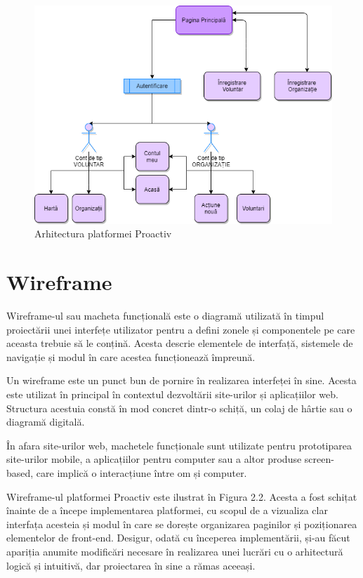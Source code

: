 \documentclass[12pt,a4paper]{report}
\begin{document}
\begin{figure}[H]
\centering
  \includegraphics[width=1\linewidth]{./imagini/arhitectura.png}
  \caption{Arhitectura platformei Proactiv}
\end{figure}

\section{Wireframe}
\par
Wireframe-ul sau macheta funcțională este o diagramă utilizată în timpul proiectării unei interfețe utilizator pentru a defini zonele și componentele pe care aceasta trebuie să le conțină. Acesta descrie elementele de interfață, sistemele de navigație și modul în care acestea funcționează împreună.
\\\par
Un wireframe este un punct bun de pornire în realizarea interfeței în sine. Acesta este utilizat în principal în contextul dezvoltării site-urilor și aplicațiilor web. Structura acestuia constă în mod concret dintr-o schiță, un colaj de hârtie sau o diagramă digitală.
\\\par
În afara site-urilor web, machetele funcționale sunt utilizate pentru prototiparea site-urilor mobile, a aplicațiilor pentru computer sau a altor produse screen-based, care implică o interacțiune între om și computer.
\\\par
Wireframe-ul platformei Proactiv este ilustrat în Figura 2.2. Acesta a fost schițat înainte de a începe implementarea platformei, cu scopul de a vizualiza clar interfața acesteia și modul în care se dorește organizarea paginilor și poziționarea elementelor de front-end. 
Desigur, odată cu începerea implementării, și-au făcut apariția anumite modificări necesare în realizarea unei lucrări cu o arhitectură logică și intuitivă, dar proiectarea în sine a rămas aceeași.
\end{document}
